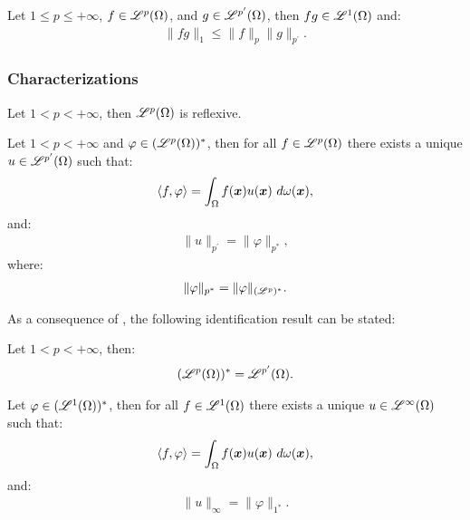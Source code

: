 \begin{theorem}
    Let $1 \leq p \leq +\infty$, $f \in \mathscr{L}^{p}(\Omega)$, and $g \in \mathscr{L}^{p^{\prime}}(\Omega)$, then $fg \in \mathscr{L}^{1}(\Omega)$ and:
    \begin{align}
        \lVert fg \rVert_1 \leq \lVert f \rVert_p \lVert g \rVert_{p^{\prime}}.
    \end{align}
\end{theorem}

\newpage
\subsubsection{Characterizations}

\begin{theorem}
    Let $1 < p < +\infty$, then $\mathscr{L}^{p}(\Omega)$ is reflexive.
\end{theorem}

\begin{theorem} \label{theorem:riesz_p}
    Let $1 < p < +\infty$ and $\varphi \in (\mathscr{L}^{p}(\Omega))^*$, then for all $f \in \mathscr{L}^{p}(\Omega)$ there exists a unique $u \in \mathscr{L}^{p^{\prime}}(\Omega)$ such that:
    \begin{align}
        \langle f, \varphi \rangle = \int_{\Omega} f(\bm{x}) u(\bm{x}) ~ d \omega(\bm{x}),
    \end{align}
    and:
    \begin{align}
        \lVert u \rVert_{p^{\prime}} = \lVert \varphi \rVert_{p^*},
    \end{align}
    where:
    \begin{align}
        \lVert \varphi \rVert_{p^*} = \lVert \varphi \rVert_{(\mathscr{L}^{p})^*}.
    \end{align}
\end{theorem}

As a consequence of , the following identification result can be stated:

\begin{theorem}
    Let $1 < p < +\infty$, then:
    \begin{align}
        (\mathscr{L}^{p}(\Omega))^* = \mathscr{L}^{p^{\prime}}(\Omega).
    \end{align}
\end{theorem}

\begin{theorem}[Riesz representation theorem for $p = 1$] \label{theorem:riesz_1}
    Let $\varphi \in (\mathscr{L}^{1}(\Omega))^*$, then for all $f \in \mathscr{L}^{1}(\Omega)$ there exists a unique $u \in \mathscr{L}^{\infty}(\Omega)$ such that:
    \begin{align}
        \langle f, \varphi \rangle = \int_{\Omega} f(\bm{x}) u(\bm{x}) ~ d \omega(\bm{x}),
    \end{align}
    and:
    \begin{align}
        \lVert u \rVert_{\infty} = \lVert \varphi \rVert_{1^*}.
    \end{align}
\end{theorem}

